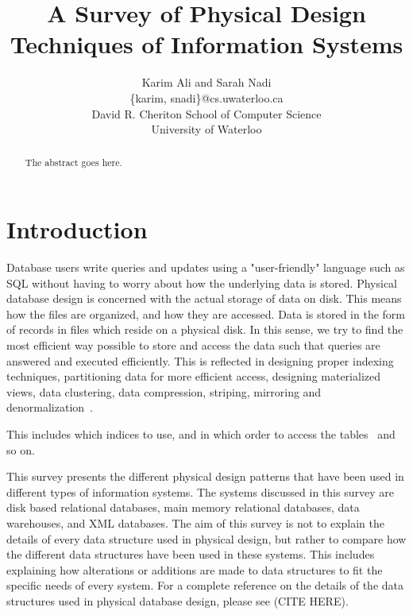 \documentclass[12pt,a4paper]{article}
\begin{document}
%
\title{A Survey of Physical Design Techniques of Information Systems}



\author{Karim Ali and Sarah Nadi\\
\{karim, snadi\}@cs.uwaterloo.ca \\
David R. Cheriton School of Computer Science\\
University of Waterloo\\
}


\maketitle


\begin{abstract}
The abstract goes here.
\end{abstract}

\section{Introduction}

Database users write queries and updates using a "user-friendly" language such as SQL without having to worry about how the underlying data is stored. Physical
database design is concerned with the actual storage of data on disk. This means how the files are organized, and how they are accessed. Data is stored in the
form of records in files which reside on a physical disk. In this sense, we try to find the most efficient way possible to store and access the data such that
queries are answered and executed efficiently. This is reflected in designing proper indexing techniques, partitioning data for more efficient access, designing
materialized views, data clustering, data compression, striping, mirroring and denormalization~\cite{lightstone2007physical}. 

This includes which indices to use, and in which order to access the tables~\cite{finkelstein1988physical} and so on.

This survey presents the different physical design patterns that have been used in different types of information systems. The systems discussed in this survey
are disk based relational databases, main memory relational databases, data warehouses, and XML databases. The aim of this survey is not to explain the details
of every data structure used in physical design, but rather to compare how the different data structures have been used in these systems. This includes
explaining how alterations or additions are made to data structures to fit the specific needs of every system. For a complete reference on the details of the
data structures used in physical database design, please see (CITE HERE). 
\end{document}
